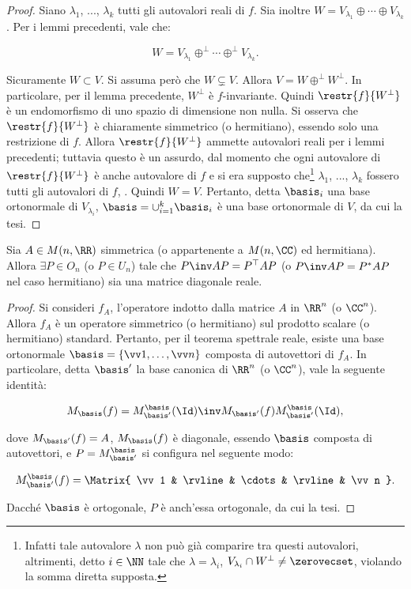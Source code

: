 \begin{proof}
	Siano $\lambda_1$, ..., $\lambda_k$ tutti gli autovalori reali di $f$. Sia inoltre
	$W = V_{\lambda_1} \oplus \cdots \oplus V_{\lambda_k}$. Per i lemmi precedenti,
	vale che:
	
	\[ W = V_{\lambda_1} \oplus^\perp \cdots \oplus^\perp V_{\lambda_k}. \]
	
	\vskip 0.05in
	
	Sicuramente $W \subset V$. Si assuma però che $W \subsetneq V$. Allora $V = W \oplus^\perp W^\perp$. In particolare, per il lemma
	precedente, $W^\perp$ è $f$-invariante. Quindi $\restr{f}{W^\perp}$ è un endomorfismo
	di uno spazio di dimensione non nulla. Si osserva che $\restr{f}{W^\perp}$ è chiaramente
	simmetrico (o hermitiano), essendo solo una restrizione di $f$. Allora $\restr{f}{W^\perp}$ ammette
	autovalori reali per i lemmi precedenti; tuttavia questo è un assurdo, dal momento che ogni autovalore di $\restr{f}{W^\perp}$ è anche autovalore di $f$ e si era supposto che\footnote{Infatti tale autovalore $\lambda$
		non può già comparire tra questi autovalori, altrimenti, detto $i \in \NN$ tale che $\lambda = \lambda_i$,  $V_{\lambda_i} \cap W^\perp \neq \zerovecset$, violando la somma diretta supposta.} $\lambda_1$, ..., $\lambda_k$ fossero
	tutti gli autovalori di $f$, \Lightning. Quindi $W = V$. Pertanto, detta $\basis_i$ una base ortonormale
	di $V_{\lambda_i}$, $\basis = \cup_{i=1}^k \basis_i$ è una base ortonormale di $V$, da cui la tesi.
\end{proof}

\begin{corollary} 
	Sia $A \in M(n, \RR)$ simmetrica (o appartenente a $M(n, \CC)$ ed hermitiana). Allora
	$\exists P \in O_n$ (o $P \in U_n$) tale che $P\inv A P = P^\top A P$ (o $P\inv A P = P^* A P$ nel caso hermitiano)
	sia una matrice diagonale reale.
\end{corollary}

\begin{proof}
	Si consideri $f_A$, l'operatore indotto dalla matrice $A$ in $\RR^n$ (o $\CC^n$). Allora
	$f_A$ è un operatore simmetrico (o hermitiano) sul prodotto scalare (o hermitiano) standard.
	Pertanto, per il teorema spettrale reale, esiste una base ortonormale $\basis = \{ \vv 1, \ldots, \vv n\}$ composta di autovettori
	di $f_A$. In particolare, detta $\basis'$ la base canonica di $\RR^n$ (o $\CC^n$), vale
	la seguente identità:
	
	\[ M_\basis(f) = M_{\basis'}^{\basis}(\Id)\inv M_{\basis'}(f) M_{\basis'}^{\basis}(\Id), \]
	
	dove $M_{\basis'}(f) = A$, $M_\basis(f)$ è diagonale, essendo $\basis$ composta di autovettori, e $P = M_{\basis'}^{\basis}$
	si configura nel seguente modo:
	
	\[ M_{\basis'}^{\basis}(f) = \Matrix{ \vv 1 & \rvline & \cdots & \rvline & \vv n }. \]
	
	Dacché $\basis$ è ortogonale, $P$ è anch'essa ortogonale, da cui la tesi.
\end{proof}

